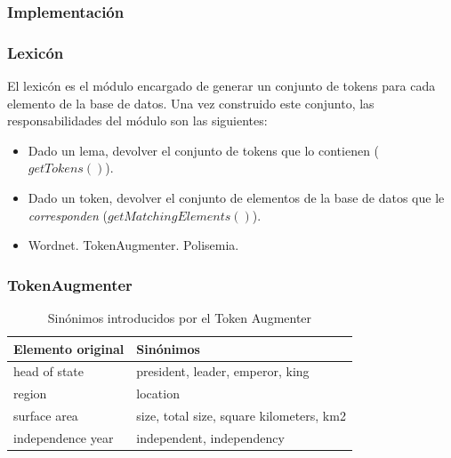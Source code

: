 \documentclass{beamer}
\begin{document}
\subsubsection*{Implementación}
\begin{frame}
\frametitle{Lexicón}
  El lexicón es el módulo encargado de generar un conjunto de tokens para cada elemento de la base de datos. Una vez construido este conjunto, las responsabilidades del módulo son las siguientes:
\begin{itemize}
  \item Dado un lema, devolver el conjunto de tokens que lo contienen ($getTokens()$).
  \item Dado un token, devolver el conjunto de elementos de la base de datos que le \textit{corresponden} ($getMatchingElements()$).
  \item Wordnet. TokenAugmenter. Polisemia.
\end{itemize}
\end{frame}

\begin{frame}
\frametitle{TokenAugmenter}
\begin{center}
\begin{table}[h]
\centering
\begin{tabular}{| l |  p{8cm} |}
\hline
Elemento original & Sinónimos \\ \hline
head of state & president, leader, emperor, king \\ \hline
region & location\\ \hline
surface area & size, total size, square kilometers, km2\\ \hline
independence year & independent, independency\\ \hline
\end{tabular}
\caption{Sinónimos introducidos por el Token Augmenter}
\label{table:token-augmenter}
\end{table}
\end{center}
\end{frame}
\end{document}
